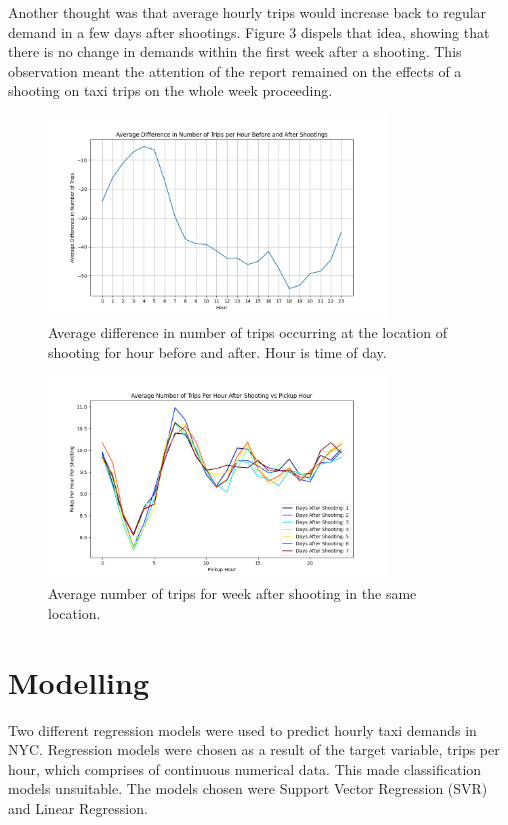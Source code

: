 \documentclass[11pt]{article}
\begin{document}
\hspace{0pt}Another thought was that average hourly trips would increase back to regular demand in a few days after shootings. Figure 3 dispels that idea, showing that there is no change in demands within the first week after a shooting. This observation meant the attention of the report remained on the effects of a shooting on taxi trips on the whole week proceeding. 

\begin{figure}[htbp]
    \centering
    \includegraphics[width=0.8\textwidth]{shooting_hourly_effects_plot.png}
    \caption{Average difference in number of trips occurring at the location of shooting for hour before and after. Hour is time of day.}
    \label{fig:taxi}
\end{figure}

\begin{figure}[H]
    \centering
    \includegraphics[width=0.8\textwidth]{Daily_Avg_Trips_Post_Shooting.png}
    \caption{Average number of trips for week after shooting in the same location.}
    \label{fig:taxi}
\end{figure}

\section{Modelling}
\hspace{0pt}Two different regression models were used to predict hourly taxi demands in NYC. Regression models were chosen as a result of the target variable, trips per hour, which comprises of continuous numerical data. This made classification models unsuitable. The models chosen were Support Vector Regression (SVR) and Linear Regression. 
\end{document}
